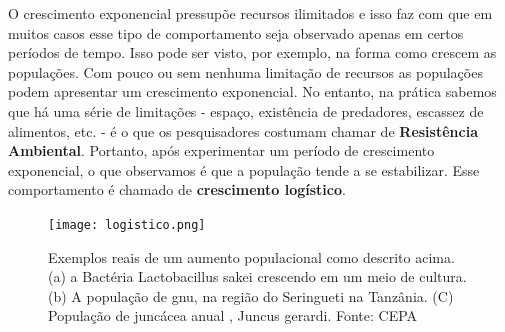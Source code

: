\begin{reflection}
O crescimento exponencial pressupõe recursos ilimitados e isso faz com que em muitos casos esse tipo de comportamento seja observado apenas em certos períodos de tempo. Isso pode ser visto, por exemplo, na forma como crescem as populações. Com pouco ou sem nenhuma limitação de recursos as populações podem apresentar um crescimento exponencial. No entanto, na prática sabemos que há uma série de limitações - espaço, existência de predadores, escassez de alimentos, etc. - é o que os pesquisadores costumam chamar de \textbf{Resistência Ambiental}. Portanto, após experimentar um período de crescimento exponencial, o que observamos é que a população tende a se estabilizar. Esse comportamento é chamado de \textbf{crescimento logístico}.

\begin{figure}[H]
\centering
\texttt{[image: logistico.png]}
\caption{Exemplos reais de um aumento populacional como descrito acima. (a) a Bactéria Lactobacillus sakei crescendo em um meio de cultura. (b) A população de gnu, na região do Seringueti na Tanzânia. (C) População de juncácea anual , Juncus gerardi.
Fonte: CEPA}
\end{figure}

\end{reflection}
\clearpage
\def\currentcolor{session1}
